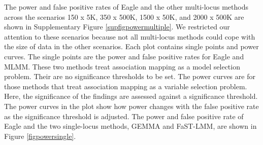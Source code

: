 \documentclass{article}
\begin{document}
The power and false positive rates of Eagle and the other multi-locus methods across the scenarios 150 x 5K, 350 x 500K, 1500 x 50K, and 2000 x 500K are shown in Supplementary Figure \ref{supfigpowermultiple}.  We restricted our attention to these scenarios because not all 
multi-locus methods could cope with the size of data in the other scenarios. 
  Each plot contains 
single points and power curves. The single points are the power and false positive rates for Eagle and MLMM.
These two methods treat association mapping as a model selection problem. Their are no significance thresholds to be set. 
The power curves are for those methods that treat association mapping as a variable selection problem. Here, the 
significance of the findings are assessed against a significance threshold. The power curves in the plot show how power changes with 
the false positive rate as the significance threshold  is adjusted. 
The power and false positive rate of Eagle and the two single-locus methods, GEMMA and FaST-LMM,  are shown in
 Figure \ref{figpowersingle}. 
\end{document}
